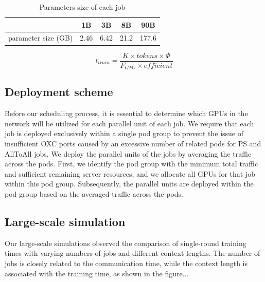 \documentclass[conference]{IEEEtran}
\begin{document}
\begin{table}[]
	\caption{Parameters size of each job}
	\label{tbl_2}
	\centering
	\begin{tabular}{c|c|c|c|c}
		\toprule
		& 1B & 3B & 8B & 90B\\
		\midrule
		parameter size (GB) & 2.46 & 6.42 & 21.2 & 177.6\\
		\bottomrule
	\end{tabular}
\end{table}

\begin{equation}\label{eq:8}
	t_{train} = \dfrac{K \times tokens \times \Phi}{F_{GPU} \times efficient}
\end{equation}

\subsection{Deployment scheme}

Before our scheduling process, it is essential to determine which GPUs in the network will be utilized for each parallel unit of each job. We require that each job is deployed exclusively within a single pod group to prevent the issue of insufficient OXC ports caused by an excessive number of related pods for PS and AllToAll jobs. We deploy the parallel units of the jobs by averaging the traffic across the pods. First, we identify the pod group with the minimum total traffic and sufficient remaining server resources, and we allocate all GPUs for that job within this pod group. Subsequently, the parallel units are deployed within the pod group based on the averaged traffic across the pods.

\subsection{Large-scale simulation}

Our large-scale simulations observed the comparison of single-round training times with varying numbers of jobs and different context lengths. The number of jobs is closely related to the communication time, while the context length is associated with the training time, as shown in the figure...
\end{document}
